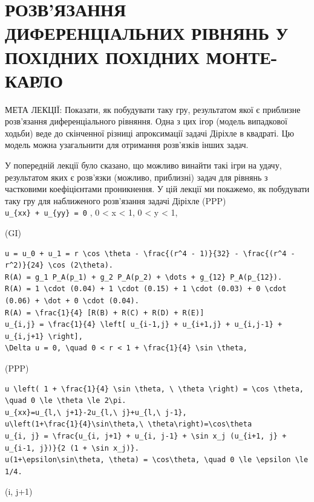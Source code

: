 \documentclass[
  ukrainian,
]{article}
\begin{document}
\section{РОЗВ'ЯЗАННЯ ДИФЕРЕНЦІАЛЬНИХ РІВНЯНЬ У ПОХІДНИХ ПОХІДНИХ
МОНТЕ-КАРЛО}\label{ux440ux43eux437ux432ux44fux437ux430ux43dux43dux44f-ux434ux438ux444ux435ux440ux435ux43dux446ux456ux430ux43bux44cux43dux438ux445-ux440ux456ux432ux43dux44fux43dux44c-ux443-ux43fux43eux445ux456ux434ux43dux438ux445-ux43fux43eux445ux456ux434ux43dux438ux445-ux43cux43eux43dux442ux435-ux43aux430ux440ux43bux43e}

МЕТА ЛЕКЦІЇ: Показати, як побудувати таку гру, результатом якої є
приблизне розв'язання диференціального рівняння. Одна з цих ігор (модель
випадкової ходьби) веде до скінченної різниці апроксимації задачі
Діріхле в квадраті. Цю модель можна узагальнити для отримання розв'язків
інших задач.

У попередній лекції було сказано, що можливо винайти такі ігри на удачу,
результатом яких є розв'язки (можливо, приблизні) задач для рівнянь з
частковими коефіцієнтами проникнення. У цій лекції ми покажемо, як
побудувати таку гру для наближеного розв'язання задачі Діріхле (PPP)
\texttt{u\_\{xx\}\ +\ u\_\{yy\}\ =\ 0} , 0 \textless{} x \textless{} 1,
0 \textless{} y \textless{} 1,

(GI)

\begin{verbatim}
u = u_0 + u_1 = r \cos \theta - \frac{(r^4 - 1)}{32} - \frac{(r^4 - r^2)}{24} \cos (2\theta).
R(A) = g_1 P_A(p_1) + g_2 P_A(p_2) + \dots + g_{12} P_A(p_{12}).
R(A) = 1 \cdot (0.04) + 1 \cdot (0.15) + 1 \cdot (0.03) + 0 \cdot (0.06) + \dot + 0 \cdot (0.04).
R(A) = \frac{1}{4} [R(B) + R(C) + R(D) + R(E)]
u_{i,j} = \frac{1}{4} \left[ u_{i-1,j} + u_{i+1,j} + u_{i,j-1} + u_{i,j+1} \right],
\Delta u = 0, \quad 0 < r < 1 + \frac{1}{4} \sin \theta,
\end{verbatim}

(PPP)

\begin{verbatim}
u \left( 1 + \frac{1}{4} \sin \theta, \ \theta \right) = \cos \theta, \quad 0 \le \theta \le 2\pi.
u_{xx}=u_{l,\ j+1}-2u_{l,\ j}+u_{l,\ j-1},
u\left(1+\frac{1}{4}\sin\theta,\ \theta\right)=\cos\theta
u_{i, j} = \frac{u_{i, j+1} + u_{i, j-1} + \sin x_j (u_{i+1, j} + u_{i-1, j})}{2 (1 + \sin x_j)}.
u(1+\epsilon\sin\theta, \theta) = \cos\theta, \quad 0 \le \epsilon \le 1/4.
\end{verbatim}

(i, j+1)
\end{document}
